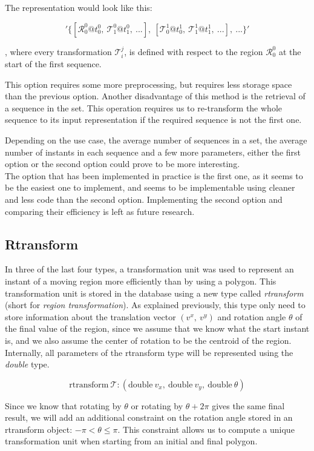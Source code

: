 The representation would look like this:

\[
    '\{[\mathcal{R}_0^0@t_0^0,\ \mathcal{T}_1^0@t_1^0,\ ...],\ [\mathcal{T}_0^1@t_0^1,\ \mathcal{T}_1^1@t_1^1,\ ...],\ ...\}'
\]

, where every transformation $\mathcal{T}_i^j$, is defined with respect to the region $\mathcal{R}_0^0$ at the start of the first sequence.

This option requires some more preprocessing, but requires less storage space than the previous option. Another disadvantage of this method is the retrieval of a sequence in the set. This operation requires us to re-transform the whole sequence to its input representation if the required sequence is not the first one.

Depending on the use case, the average number of sequences in a set, the average number of instants in each sequence and a few more parameters, either the first option or the second option could prove to be more interesting. \\

The option that has been implemented in practice is the first one, as it seems to be the easiest one to implement, and seems to be implementable using cleaner and less code than the second option. Implementing the second option and comparing their efficiency is left as future research.

\subsection{Rtransform}

In three of the last four types, a transformation unit was used to represent an instant of a moving region more efficiently than by using a polygon. This transformation unit is stored in the database using a new type called \textit{rtransform} (short for \textit{region transformation}). As explained previously, this type only need to store information about the translation vector $(v^x,\ v^y)$ and rotation angle $\theta$ of the final value of the region, since we assume that we know what the start instant is, and we also assume the center of rotation to be the centroid of the region. Internally, all parameters of the rtransform type will be represented using the \textit{double} type.

\[
    \text{rtransform}\ \mathcal{T}: (\text{double}\ v_x,\ \text{double}\ v_y,\ \text{double}\ \theta)
\]

Since we know that rotating by $\theta$ or rotating by $\theta + 2\pi$ gives the same final result, we will add an additional constraint on the rotation angle stored in an rtransform object: $-\pi < \theta \le \pi$. This constraint allows us to compute a unique transformation unit when starting from an initial and final polygon. \\

